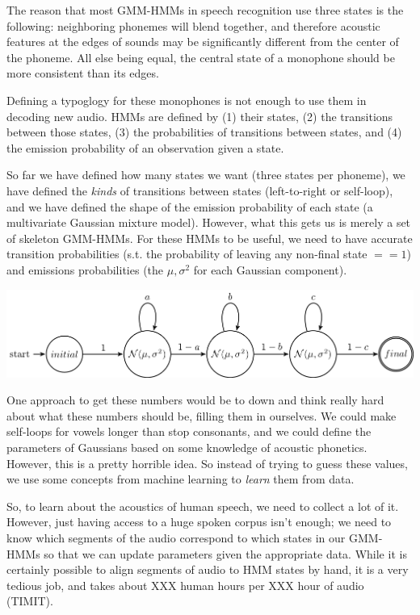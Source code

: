 \documentclass[10pt,a4paper]{article}
\begin{document}
The reason that most GMM-HMMs in speech recognition use three states is the following: neighboring phonemes will blend together, and therefore acoustic features at the edges of sounds may be significantly different from the center of the phoneme. All else being equal, the central state of a monophone should be more consistent than its edges.

Defining a typoglogy for these monophones is not enough to use them in decoding new audio. HMMs are defined by (1) their states, (2) the transitions between those states, (3) the probabilities of transitions between states, and (4) the emission probability of an observation given a state.

So far we have defined how many states we want (three states per phoneme), we have defined the \textit{kinds} of transitions between states (left-to-right or self-loop), and we have defined the shape of the emission probability of each state (a multivariate Gaussian mixture model). However, what this gets us is merely a set of skeleton GMM-HMMs. For these HMMs to be useful, we need to have accurate transition probabilities (s.t. the probability of leaving any non-final state $== 1$) and emissions probabilities (the $\mu, \sigma^2$ for each Gaussian component).

\begin{center}
\includegraphics[width=.9\textwidth,keepaspectratio]{figs/skeleton-hmm.png}
\end{center}

One approach to get these numbers would be to down and think really hard about what these numbers should be, filling them in ourselves. We could make self-loops for vowels longer than stop consonants, and we could define the parameters of Gaussians based on some knowledge of acoustic phonetics. However, this is a pretty horrible idea. So instead of trying to guess these values, we use some concepts from machine learning to \textit{learn} them from data.

So, to learn about the acoustics of human speech, we need to collect a lot of it. However, just having access to a huge spoken corpus isn't enough; we need to know which segments of the audio correspond to which states in our GMM-HMMs so that we can update parameters given the appropriate data. While it is certainly possible to align segments of audio to HMM states by hand, it is a very tedious job, and takes about XXX human hours per XXX hour of audio (TIMIT).
\end{document}
